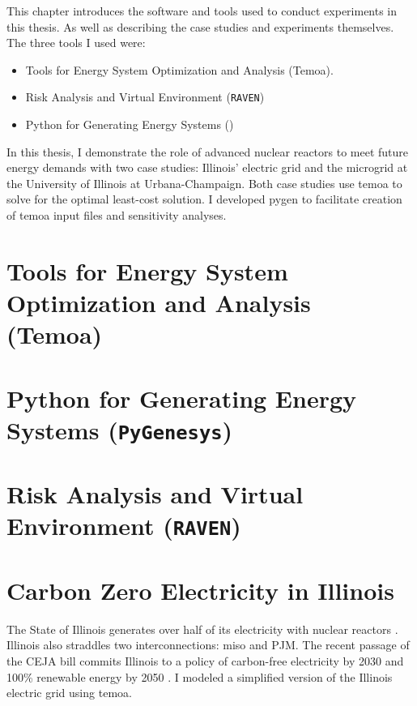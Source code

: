 This chapter introduces the software and tools used to conduct experiments in this
thesis. As well as describing the case studies and experiments themselves.
The three tools I used were:
\begin{itemize}
  \item Tools for Energy System Optimization and Analysis (Temoa).
  \item Risk Analysis and Virtual Environment (\texttt{RAVEN})
  \item Python for Generating Energy Systems (\pygen)
\end{itemize}
In this thesis, I demonstrate the role of advanced nuclear reactors to meet future
energy demands with two case studies: Illinois’ electric grid and the microgrid
at the University of Illinois at Urbana-Champaign. Both case studies use \gls{temoa}
to solve for the optimal least-cost solution. I developed \gls{pygen} to
facilitate creation of \gls{temoa} input files and sensitivity analyses.

\section{Tools for Energy System Optimization and Analysis (Temoa)}


\section{Python for Generating Energy Systems (\texttt{PyGenesys})}


\section{Risk Analysis and Virtual Environment (\texttt{RAVEN})}


\section{Carbon Zero Electricity in Illinois}
\label{section:ilmodel}
The State of Illinois generates over half of its electricity with nuclear reactors
\cite{energy_information_administration_eia_nodate}.
Illinois also straddles two interconnections: \gls{miso} and PJM. The recent
passage of the CEJA bill commits Illinois to a policy of carbon-free electricity
by 2030 and 100\% renewable energy by 2050 \cite{harmon_climate_2021}.
I modeled a simplified version of the Illinois electric grid using \gls{temoa}.

